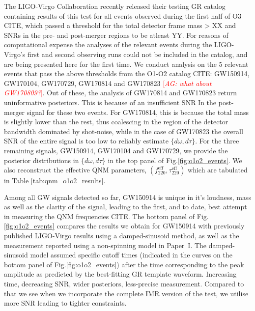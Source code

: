 \documentclass[twocolumn,prd,superscriptaddress,amsfonts,amssymb,amsmath,preprintnumbers]{revtex4-1}
\newcommand{\paperone}{Paper~I\xspace}
\newcommand{\abhi}[1]{\textcolor{red}{[\textit{AG: #1}]}}
\begin{document}
The LIGO-Virgo Collaboration recently released their testing GR catalog containing results of this test for all events observed during the first half of O3 CITE, which passed a threshold for the total detector frame mass > XX and SNRs in the pre- and post-merger regions to be atleast YY. For reasons of computational expense the analyses of the relevant events during the LIGO-Virgo's first and second observing runs could not be included in the catalog, and are being presented here for the first time. We conduct analysis on the 5 relevant events that pass the above thresholds from the O1-O2 catalog CITE: GW150914, GW170104, GW170729, GW170814 and GW170823 \abhi{what about GW170809?}. Out of these, the analysis of GW170814 and GW170823 return uninformative posteriors. This is because of an insufficient SNR In the post-merger signal for these two events. For GW170814, this is because the total mass is slightly lower than the rest, thus coalescing in the region of the detector bandwidth dominated by shot-noise, while in the case of GW170823 the overall SNR of the entire signal is too low to reliably estimate $\{d\omega,d\tau\}$. For the three remaining signals, GW150914, GW170104 and GW170729, we provide the posterior distributions in $\{d\omega,d\tau\}$ in the top panel of Fig.\ref{fig:o1o2_events}. We also reconstruct the effective QNM parameters, $(f_{220}^{\text{eff}}, \tau _{220}^{\text{eff}})$ which are tabulated in Table \ref{tab:qnm_o1o2_results}.

Among all GW signals detected so far, GW150914 is unique in it's loudness, mass as well as the clarity of the signal, leading to the first, and to date, best attempt in measuring the QNM frequencies CITE. The bottom panel of Fig.\ref{fig:o1o2_events} compares the results we obtain for GW150914 with previously published LIGO-Virgo results using a damped-sinusoid method, as well as the measurement reported using a non-spinning model in \paperone. The damped-sinusoid model assumed specific cutoff times (indicated in the curves on the bottom panel of Fig.\ref{fig:o1o2_events}) after the time corresponding to the peak amplitude as predicted by the best-fitting GR template waveform. Increasing time, decreasing SNR, wider posteriors, less-precise measurement. Compared to that we see when we incorporate the complete IMR version of the test, we utilise more SNR leading to tighter constraints.
\end{document}
